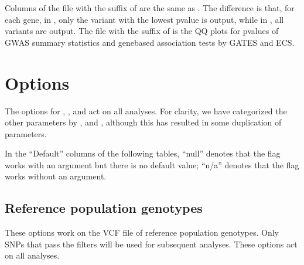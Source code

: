 \documentclass[letterpaper,10pt,english,openany,oneside]{sphinxmanual}
\begin{document}
\sphinxAtStartPar
Columns of the file with the suffix of  are the same as . The difference is that, for each gene, in , only the variant with the lowest p\sphinxhyphen{}value is output, while in , all variants are output. The file with the suffix of  is the Q\sphinxhyphen{}Q plots for p\sphinxhyphen{}values of GWAS summary statistics and gene\sphinxhyphen{}based association tests by GATES and ECS.

\sphinxstepscope


\chapter{Options}
\label{\detokenize{options:options}}\label{\detokenize{options:id1}}\label{\detokenize{options::doc}}
\sphinxAtStartPar
The options for {\hyperref[\detokenize{options:option-vcf}]{}}, {\hyperref[\detokenize{options:option-gwas}]{}}, and {\hyperref[\detokenize{options:option-misc}]{}} act on all analyses. For clarity, we have categorized the other parameters by {\hyperref[\detokenize{options:option-assoc}]{}}, {\hyperref[\detokenize{options:option-dese}]{}} and {\hyperref[\detokenize{options:option-emic}]{}}, although this has resulted in some duplication of parameters.

\sphinxAtStartPar
In the “Default” columns of the following tables, “null” denotes that the flag works with an argument but there is no default value; “n/a” denotes that the flag works without an argument.


\section{Reference population genotypes}
\label{\detokenize{options:reference-population-genotypes}}\label{\detokenize{options:option-vcf}}
\sphinxAtStartPar
These options work on the VCF file of reference population genotypes. Only SNPs that pass the filters will be used for subsequent analyses. These options act on all analyses.
\end{document}
